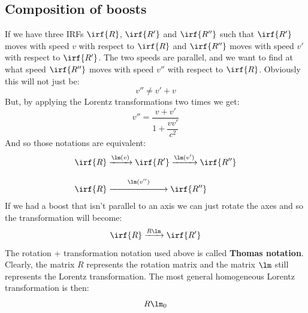 \subsection{Composition of boosts}
If we have three IRFs $\irf{R}$, $\irf{R'}$ and $\irf{R''}$ such that $\irf{R'}$ moves with speed $v$ with respect to $\irf{R}$ and $\irf{R''}$ moves with speed $v'$ with respect to $\irf{R'}$. The two speeds are parallel, and we want to find at what speed $\irf{R''}$ moves with speed $v''$ with respect to $\irf{R}$. Obviously this will not just be:
\begin{equation}
  v'' \neq v' + v
\end{equation}
But, by applying the Lorentz transformations two times we get:
\begin{equation}
  v'' = \dfrac{v + v'}{1 + \dfrac{vv'}{c^2}}
\end{equation}
And so those notations are equivalent:
\begin{equation}
  \begin{split}
    &\irf{R} \xrightarrow{\lm(v)} \irf{R'} \xrightarrow{\lm(v')} \irf{R''}\\[8pt]
    &\irf{R} \overset{\lm(v'')}{\xrightarrow{\makebox[2.25cm]{}}} \irf{R''}
  \end{split}
\end{equation}
If we had a boost that isn't parallel to an axis we can just rotate the axes and so the transformation will become:
\begin{equation}
  \irf{R} \xrightarrow{R\lm} \irf{R'}
\end{equation}
The rotation + transformation notation used above is called \textbf{Thomas notation}. Clearly, the matrix $R$ represents the rotation matrix and the matrix $\lm$ still represents the Lorentz transformation. The most general homogeneous Lorentz transformation is then:
\begin{equation}
  R\lm_0
\end{equation}
